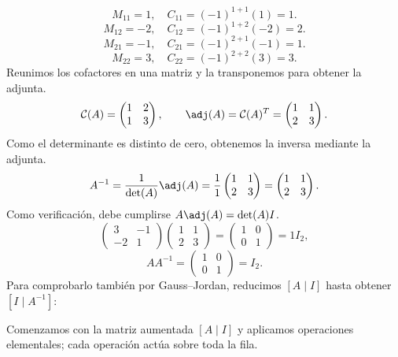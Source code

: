 \[
M_{11}=1,\quad C_{11}=(-1)^{1+1}(1)=1.
\]
\[
M_{12}=-2,\quad C_{12}=(-1)^{1+2}(-2)=2.
\]
\[
M_{21}=-1,\quad C_{21}=(-1)^{2+1}(-1)=1.
\]
\[
M_{22}=3,\quad C_{22}=(-1)^{2+2}(3)=3.
\]
Reunimos los cofactores en una matriz y la transponemos para obtener la adjunta.
\[
\mathcal{C}(A)=\begin{pmatrix}1&2\\1&3\end{pmatrix},\qquad\adj(A)=\mathcal{C}(A)^T=\begin{pmatrix}1&1\\2&3\end{pmatrix}.
\]
Como el determinante es distinto de cero, obtenemos la inversa mediante la adjunta.
\[
A^{-1}=\frac1{\det(A)}\adj(A)=\frac1{1}\begin{pmatrix}1&1\\2&3\end{pmatrix}=\begin{pmatrix}1&1\\2&3\end{pmatrix}.
\]
Como verificación, debe cumplirse $A\adj(A)=\det(A)I$.
\[
\begin{pmatrix}3&-1\\-2&1\end{pmatrix}\begin{pmatrix}1&1\\2&3\end{pmatrix}=\begin{pmatrix}1&0\\0&1\end{pmatrix}=1I_{2},
\]
\[
AA^{-1}=\begin{pmatrix}1&0\\0&1\end{pmatrix}=I_{2}.
\]
Para comprobarlo también por Gauss--Jordan, reducimos $[A\mid I]$ hasta obtener $[I\mid A^{-1}]$:

Comenzamos con la matriz aumentada $[A\mid I]$ y aplicamos operaciones elementales; cada operación actúa sobre toda la fila.

